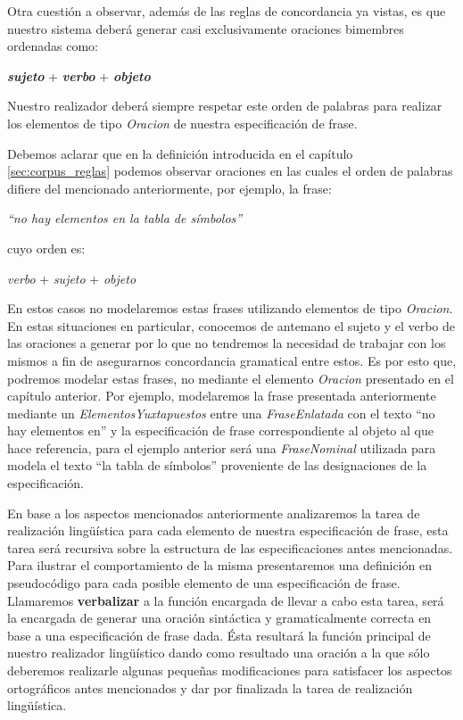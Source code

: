 \bigskip
Otra cuestión a observar, además de las reglas de concordancia ya vistas, es que nuestro sistema deberá generar casi exclusivamente oraciones bimembres ordenadas como:

\begin{center}
\emph{\textbf{sujeto}} + \emph{\textbf{verbo}} + \emph{\textbf{objeto}}
\end{center}

Nuestro realizador deberá siempre respetar este orden de palabras para realizar los elementos de tipo \emph{Oracion} de nuestra especificación de frase. 

Debemos aclarar que en la definición introducida en el capítulo \ref{sec:corpus_reglas} podemos observar oraciones en las cuales el orden de palabras difiere del mencionado anteriormente, por ejemplo, la frase:

\begin{center}
\emph{``no hay elementos en la tabla de símbolos''}
\end{center}

\noindent
cuyo orden es: 

\begin{center}
\emph{verbo} + \emph{sujeto} + \emph{objeto}
\end{center}

En estos casos no modelaremos estas frases utilizando elementos de tipo \emph{Oracion}. En estas situaciones en particular, conocemos de antemano el sujeto y el verbo de las oraciones a generar por lo que no tendremos la necesidad de trabajar con los mismos a fin de asegurarnos concordancia gramatical entre estos. Es por esto que, podremos modelar estas frases, no mediante el elemento \emph{Oracion} presentado en el capítulo anterior. Por ejemplo, modelaremos la frase presentada anteriormente mediante un \emph{ElementosYuxtapuestos} entre una \emph{FraseEnlatada} con el texto ``no hay elementos en'' y la especificación de frase correspondiente al objeto al que hace referencia, para el ejemplo anterior será una \emph{FraseNominal} utilizada para modela el texto ``la tabla de símbolos'' proveniente de las designaciones de la especificación.


\bigskip
En base a los aspectos mencionados anteriormente analizaremos la tarea de realización lingüística para cada elemento de nuestra especificación de frase, esta tarea será recursiva sobre la estructura de las especificaciones antes mencionadas. Para ilustrar el comportamiento de la misma presentaremos una definición en pseudocódigo para cada posible elemento de una especificación de frase. Llamaremos \textbf{verbalizar} a la función encargada de llevar a cabo esta tarea, será la encargada de generar una oración sintáctica y gramaticalmente correcta  en base a una especificación de frase dada. Ésta resultará la función principal de nuestro realizador lingüístico dando como resultado una oración a la que sólo deberemos realizarle algunas pequeñas modificaciones para satisfacer los aspectos ortográficos antes mencionados y dar por finalizada la tarea de realización lingüística.

